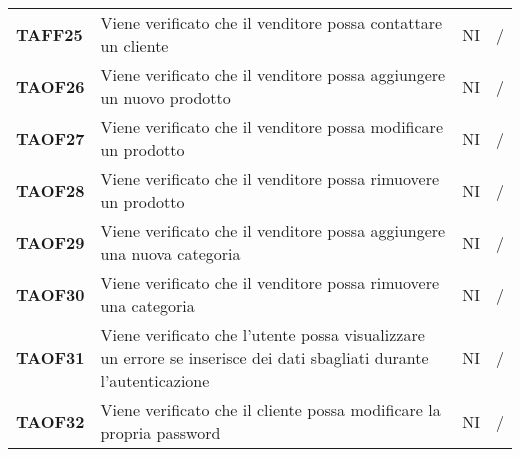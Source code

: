 \begin{center}
\begin{longtable}[!h]{p{60px} p{240px} p{35px} p{35px}}
        \textbf{TAFF25} & Viene verificato che il venditore possa contattare un cliente                                                       & NI              & /              \\
        \textbf{TAOF26} & Viene verificato che il venditore possa aggiungere un nuovo prodotto                                                & NI              & /              \\
        \textbf{TAOF27} & Viene verificato che il venditore possa modificare un prodotto                                                      & NI              & /              \\
        \textbf{TAOF28} & Viene verificato che il venditore possa rimuovere un prodotto                                                       & NI              & /              \\
        \textbf{TAOF29} & Viene verificato che il venditore possa aggiungere una nuova categoria                                              & NI              & /              \\
        \textbf{TAOF30} & Viene verificato che il venditore possa rimuovere una categoria                                                     & NI              & /              \\
        \textbf{TAOF31} & Viene verificato che l'utente possa visualizzare un errore se inserisce dei dati sbagliati durante l'autenticazione & NI              & /              \\
        \textbf{TAOF32} & Viene verificato che il cliente possa modificare la propria password                                                & NI              & /              \\
    
\end{longtable}
\end{center}
